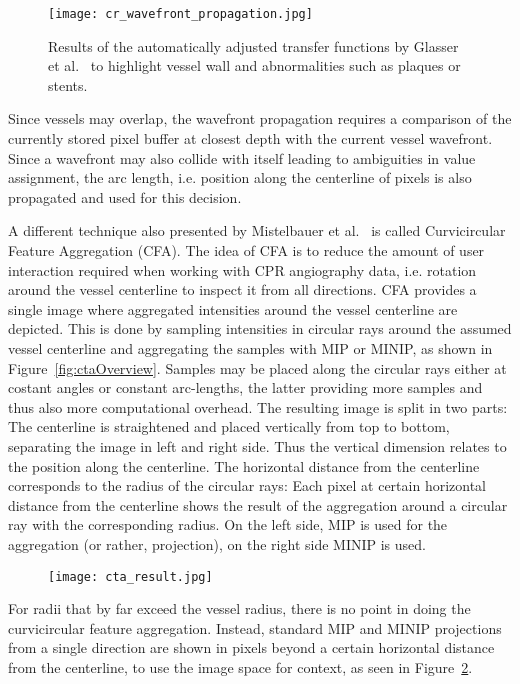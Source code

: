 \begin{figure}[htb]
  \centering
  \texttt{[image: cr\_wavefront\_propagation.jpg]}
  \caption{\label{fig:crWavefrontPropagation} Results of the automatically adjusted transfer functions by Glasser et al.~\cite{glasser2010automatic} to highlight vessel wall and abnormalities such as plaques or stents.}
\end{figure}
Since vessels may overlap, the wavefront propagation requires a comparison of the currently stored pixel buffer at closest depth with the current vessel wavefront. Since a wavefront may also collide with itself leading to ambiguities in value assignment, the arc length, i.e. position along the centerline of pixels is also propagated and used for this decision.

A different technique also presented by Mistelbauer et al.~\cite{mistelbauer2013vessel} is called Curvicircular Feature Aggregation (CFA). The idea of CFA is to reduce the amount of user interaction required when working with CPR angiography data, i.e. rotation around the vessel centerline to inspect it from all directions. CFA provides a single image where aggregated intensities around the vessel centerline are depicted. This is done by sampling intensities in circular rays around the assumed vessel centerline and aggregating the samples with MIP or MINIP, as shown in Figure~\ref{fig:ctaOverview}. Samples may be placed along the circular rays either at costant angles or constant arc-lengths, the latter providing more samples and thus also more computational overhead. The resulting image is split in two parts: The centerline is straightened and placed vertically from top to bottom, separating the image in left and right side. Thus the vertical dimension relates to the position along the centerline. The horizontal distance from the centerline corresponds to the radius of the circular rays: Each pixel at certain horizontal distance from the centerline shows the result of the aggregation around a circular ray with the corresponding radius. On the left side, MIP is used for the aggregation (or rather, projection), on the right side MINIP is used.
\begin{figure}[htb]
  \centering
  \texttt{[image: cta\_result.jpg]}
  \caption{\label{fig:ctaResult} }
\end{figure}
For radii that by far exceed the vessel radius, there is no point in doing the curvicircular feature aggregation. Instead, standard MIP and MINIP projections from a single direction are shown in pixels beyond a certain horizontal distance from the centerline, to use the image space for context, as seen in Figure~\ref{fig:ctaResult}.
